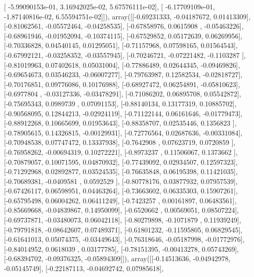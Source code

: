 \documentclass{article}
\begin{document}
       [ -5.99090153e-01,   3.16942025e-02,   5.67576111e-02],
       [ -6.17709109e-01,  -1.87140816e-02,   6.55594751e-02]]), array([[-0.69231333, -0.04187672,  0.01413309],
       [-0.81062561, -0.05572464, -0.04258535],
       [-0.67858976,  0.0615908 , -0.05463226],
       [-0.68961946, -0.01952094, -0.10374115],
       [-0.67529852,  0.05172639,  0.06269956],
       [-0.70336828,  0.04540145,  0.01295051],
       [-0.71157968,  0.07598165,  0.01564543],
       [-0.67992121, -0.03258352, -0.03557945],
       [-0.70246721, -0.07221482, -0.1103287 ],
       [-0.81019963,  0.07402618,  0.05031004],
       [-0.77886489,  0.02644345, -0.09469826],
       [-0.69654673,  0.03546233, -0.06007277],
       [-0.79763987,  0.12582534, -0.02818727],
       [-0.70176851,  0.09776086,  0.10176988],
       [-0.68927472,  0.06254891, -0.05810623],
       [-0.6977804 , -0.03127336, -0.03478291],
       [-0.71086202,  0.06895708,  0.05542872],
       [-0.75695343,  0.0989739 ,  0.07091153],
       [-0.88140134,  0.13177319,  0.10885702],
       [-0.90568095,  0.12844213, -0.02924119],
       [-0.71122144,  0.06161646, -0.01779473],
       [-0.88912268,  0.10665699,  0.01953643],
       [-0.88358707,  0.02535446,  0.1356823 ],
       [-0.78905615,  0.14326815, -0.00129931],
       [-0.72776564,  0.02687636, -0.00331084],
       [-0.70948538,  0.07747472,  0.13337938],
       [-0.7642908 ,  0.07623719,  0.0720859 ],
       [-0.76958262, -0.00694319,  0.10272221],
       [-0.8973237 ,  0.11506067,  0.1373662 ],
       [-0.70879057,  0.10071595,  0.04870932],
       [-0.77439092,  0.02934507,  0.12597323],
       [-0.71292968,  0.02892877,  0.03524535],
       [-0.76635848,  0.06195398,  0.11421035],
       [-0.70689381, -0.0409581 ,  0.0592529 ],
       [-0.80778176,  0.03877932,  0.07957539],
       [-0.67426117,  0.06598951,  0.04463264],
       [-0.73663602,  0.06335303,  0.15907261],
       [-0.65795498,  0.06004262,  0.06411249],
       [-0.7423257 ,  0.00161897,  0.06483561],
       [-0.85669668, -0.04839867,  0.14950099],
       [-0.6520662 ,  0.00569051,  0.08507224],
       [-0.69737871, -0.03480073,  0.06042118],
       [-0.80279898, -0.1071879 ,  0.11939249],
       [-0.79791818, -0.08642607,  0.07489371],
       [-0.61801232, -0.11595805,  0.06829545],
       [-0.61641013,  0.05074375, -0.03449643],
       [-0.76318646, -0.05187998, -0.01772976],
       [-0.84014952,  0.0618039 ,  0.03177785],
       [-0.78151395, -0.00413278,  0.05743269],
       [-0.68394702, -0.09376325, -0.05894309]]), array([[-0.14513636, -0.04942978, -0.05145749],
       [-0.22187113, -0.04692742,  0.07985618],
\end{document}
